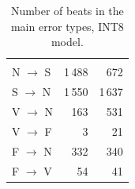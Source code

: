\begin{table}[H]
  \centering
  \caption{Number of beats in the main error types, INT8 model.}
  \label{tab:error-counts}
  \begin{tabularx}{\linewidth}{lRR}
     &  &  \\
    N $\rightarrow$ S & 1\,488 & 672 \\
    S $\rightarrow$ N & 1\,550 & 1\,637 \\
    V $\rightarrow$ N & 163 & 531 \\
    V $\rightarrow$ F & 3 & 21 \\
    F $\rightarrow$ N & 332 & 340 \\
    F $\rightarrow$ V & 54 & 41 \\
    \bottomrule
  \end{tabularx}
\end{table}
